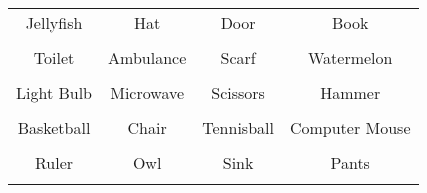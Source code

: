\documentclass[12pt,a4paper]{article}
\begin{document}
\thispagestyle{empty}
\begin{table}[]
\centering
\Huge
\begin{tabular}{cccc}
 Jellyfish& Hat& Door& Book\\  & & & \\
 Toilet& Ambulance& Scarf& Watermelon\\  & & & \\
 Light Bulb& Microwave& Scissors& Hammer\\  & & & \\
 Basketball& Chair& Tennisball& Computer Mouse\\  & & & \\
 Ruler& Owl& Sink& Pants\\  & & & \\
\end{tabular}
\end{table}
\end{document}
